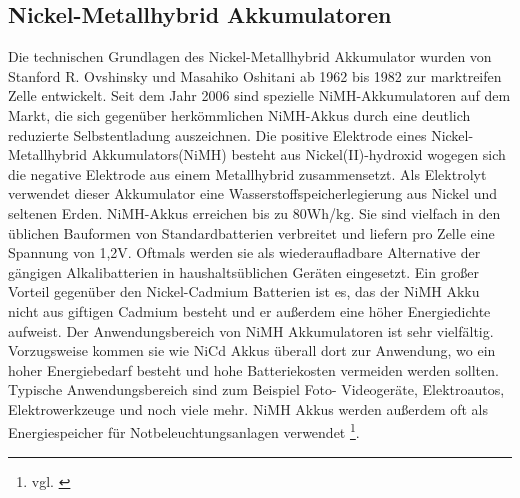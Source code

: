 \subsection{Nickel-Metallhybrid Akkumulatoren}
Die technischen Grundlagen des Nickel-Metallhybrid Akkumulator wurden von Stanford R. Ovshinsky und Masahiko Oshitani ab 1962 bis 1982 zur marktreifen Zelle entwickelt. Seit dem Jahr 2006 sind spezielle NiMH-Akkumulatoren auf dem Markt, die sich gegenüber herkömmlichen NiMH-Akkus durch eine deutlich reduzierte Selbstentladung auszeichnen. Die positive Elektrode eines Nickel-Metallhybrid Akkumulators(NiMH) besteht aus Nickel(II)-hydroxid wogegen sich die negative Elektrode aus einem Metallhybrid zusammensetzt. Als Elektrolyt verwendet dieser Akkumulator eine Wasserstoffspeicherlegierung aus Nickel und seltenen Erden. NiMH-Akkus erreichen bis zu 80Wh/kg. Sie sind vielfach in den üblichen Bauformen von Standardbatterien verbreitet und liefern pro Zelle eine Spannung von 1,2V. Oftmals werden sie als wiederaufladbare Alternative der gängigen Alkalibatterien in haushaltsüblichen Geräten eingesetzt. Ein großer Vorteil gegenüber den Nickel-Cadmium Batterien ist es, das der NiMH Akku nicht aus giftigen Cadmium besteht und er außerdem eine höher Energiedichte aufweist.
Der Anwendungsbereich von NiMH Akkumulatoren ist sehr vielfältig. Vorzugsweise kommen sie wie NiCd Akkus überall dort zur Anwendung, wo ein hoher Energiebedarf besteht und hohe Batteriekosten vermeiden werden sollten. Typische Anwendungsbereich sind zum Beispiel Foto- Videogeräte, Elektroautos, Elektrowerkzeuge und noch viele mehr. NiMH Akkus werden außerdem oft als Energiespeicher für Notbeleuchtungsanlagen verwendet \footnote{vgl. \cite{Nickel-Metallhydrid-Akkumulator}}.
\newpage
